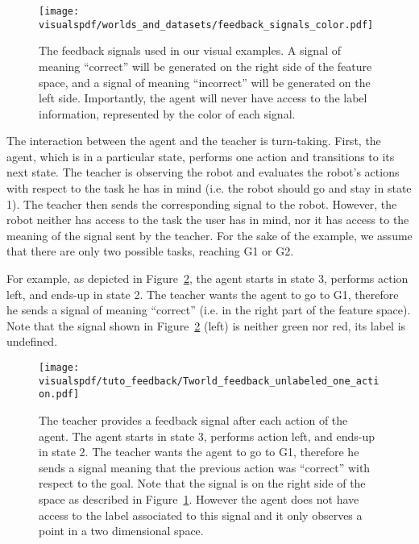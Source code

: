 \begin{figure}[!htbp]
  \centering
  \texttt{[image: \\visualspdf/worlds\_and\_datasets/feedback\_signals\_color.pdf]}
  \caption{The feedback signals used in our visual examples. A signal of meaning ``correct'' will be generated on the right side of the feature space, and a signal of meaning ``incorrect'' will be generated on the left side. Importantly, the agent will never have access to the label information, represented by the color of each signal.}
  \label{fig:feedbacksignals}
\end{figure}

The interaction between the agent and the teacher is turn-taking. First, the agent, which is in a particular state, performs one action and transitions to its next state. The teacher is observing the robot and evaluates the robot's actions with respect to the task he has in mind (i.e. the robot should go and stay in state 1). The teacher then sends the corresponding signal to the robot. However, the robot neither has access to the task the user has in mind, nor it has access to the meaning of the signal sent by the teacher. For the sake of the example, we assume that there are only two possible tasks, reaching G1 or G2.

For example, as depicted in Figure~\ref{fig:TworldOneStepUnlabeled}, the agent starts in state 3, performs action left, and ends-up in state 2. The teacher wants the agent to go to G1, therefore he sends a signal of meaning ``correct'' (i.e. in the right part of the feature space). Note that the signal shown in Figure~\ref{fig:TworldOneStepUnlabeled} (left) is neither green nor red, its label is undefined.

\begin{figure}[!htbp]
  \centering
  \texttt{[image: \\visualspdf/tuto\_feedback/Tworld\_feedback\_unlabeled\_one\_action.pdf]}
  \caption{The teacher provides a feedback signal after each action of the agent. The agent starts in state 3, performs action left, and ends-up in state 2. The teacher wants the agent to go to G1, therefore he sends a signal meaning that the previous action was ``correct'' with respect to the goal. Note that the signal is on the right side of the space as described in Figure~\ref{fig:feedbacksignals}. However the agent does not have access to the label associated to this signal and it only observes a point in a two dimensional space.}
  \label{fig:TworldOneStepUnlabeled}
\end{figure}

